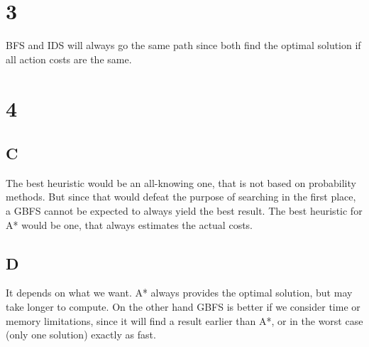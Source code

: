 \documentclass{article}
\begin{document}
    \section*{3}
    BFS and IDS will always go the same path since both find the optimal solution if all action costs are the same. 
    \section*{4}
    \subsection*{C}
    The best heuristic would be an all-knowing one, that is not based on probability methods. But since that would defeat the purpose of searching in the first place, a GBFS cannot be expected to always yield the best result.
    The best heuristic for A* would be one, that always estimates the actual costs.
    \subsection*{D}
    It depends on what we want. A* always provides the optimal solution, but may take longer to compute. 
On the other hand GBFS is better if we consider time or memory limitations, since it will find a result earlier than A*, or in the worst case (only one solution) exactly as fast.
\end{document}
